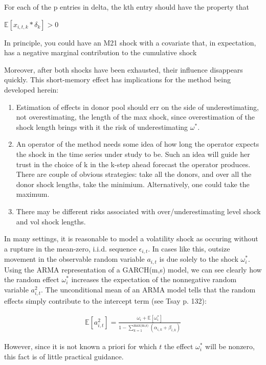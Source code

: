 \documentclass[11pt]{article}
\theoremstyle{definition}
\begin{document}
 For each of the p entries in delta, the kth entry should have the property that
 
 $\mathbb{E}[ x_{i,t,k} * \delta_{k} ] > 0$
 
 In principle, you could have an M21 shock with a covariate that, in expectation, has a negative marginal contribution to the cumulative shock

Moreover, after both shocks have been exhausted, their influence disappears quickly.  This short-memory effect has implications for the method being developed herein:

\begin{enumerate}
\item Estimation of effects in donor pool should err on the side of underestimating, not overestimating, the length of the max shock, since overestimation of the shock length brings with it the risk of underestimating $\omega^{*}$.
\item An operator of the method needs some idea of how long the operator expects the shock in the time series under study to be.  Such an idea will guide her trust in the choice of k in the k-step ahead forecast the operator produces.  There are couple of obvious strategies: take all the donors, and over all the donor shock lengths, take the minimium.  Alternatively, one could take the maximum.
\item There may be different risks associated with over/underestimating level shock and vol shock lengths.
\end{enumerate}



In many settings, it is reasonable to model a volatility shock as occuring without a rupture in the mean-zero, i.i.d. sequence $\epsilon_{i,t}$.  In cases like this, outsize movement in the observable random variable $a_{i,t}$ is due solely to the shock $\omega_{i}^{*}$.  Using the ARMA representation of a GARCH(m,s) model, we can see clearly how the random effect $\omega_{i}^{*}$ increases the expectation of the nonnegative random variable $a_{i,t}^{2}$.  The unconditional mean of an ARMA model tells that the random effects simply contribute to the intercept term (see Tsay p. 132):

\begin{align*} 
\mathbb{E}[a^{2}_{i,t}] = \frac{\omega_{i} + \mathbb{E}[\omega_{i}^{*}] }{1 - \sum^{\text{max(m,s)}}_{k=1}(\alpha_{i,k}+\beta_{i,k})}
\end{align*} 

However, since it is not known a priori for which $t$ the effect $\omega_{i}^{*}$ will be nonzero, this fact is of little practical guidance.
\end{document}
